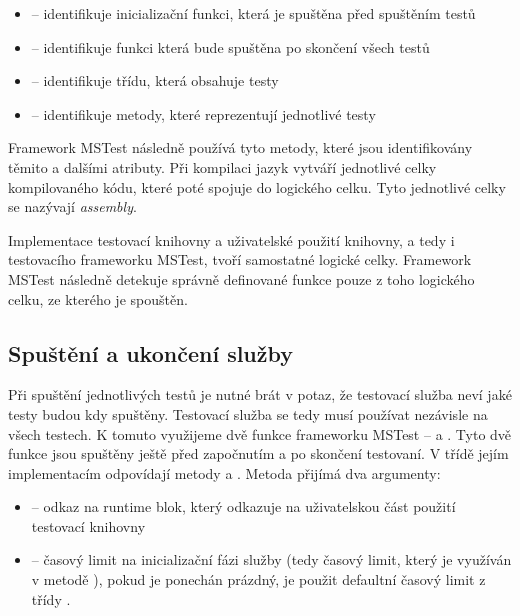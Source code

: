 \begin{itemize}
    \item {} -- identifikuje inicializační funkci, která je spuštěna před spuštěním testů \cite{attr_init_clean}
    \item {} -- identifikuje funkci která bude spuštěna po skončení všech testů \cite{attr_init_clean}
    \item {} -- identifikuje třídu, která obsahuje testy \cite{mstest_docs}
    \item {} -- identifikuje metody, které reprezentují jednotlivé  testy \cite{mstest_docs}
\end{itemize}

Framework MSTest následně používá tyto metody, které jsou identifikovány těmito a dalšími atributy. Při kompilaci jazyk \csharp{} vytváří jednotlivé celky kompilovaného kódu, které poté spojuje do logického celku. Tyto jednotlivé celky se nazývají \textit{assembly}. \cite{assembly}

Implementace testovací knihovny a uživatelské použití knihovny, a tedy i testovacího frameworku MSTest, tvoří samostatné logické celky. Framework MSTest následně detekuje správně definované funkce pouze z toho logického celku, ze kterého je spouštěn.

\subsection{Spuštění a ukončení služby}

Při spuštění jednotlivých testů je nutné brát v potaz, že testovací služba neví jaké testy budou kdy spuštěny. Testovací služba se tedy musí používat nezávisle na všech testech. K tomuto využijeme dvě funkce frameworku MSTest --  a . Tyto dvě funkce jsou spuštěny ještě před započnutím a po skončení testovaní. V třídě  jejím implementacím odpovídají metody  a . Metoda  přijímá dva argumenty:

\begin{itemize}
    \item {} -- odkaz na runtime blok, který odkazuje na uživatelskou část použití testovací knihovny
    \item {} -- časový limit na inicializační fázi služby (tedy časový limit, který je využíván v metodě ), pokud je ponechán prázdný, je použit defaultní časový limit z třídy .
\end{itemize}

